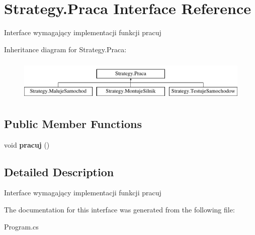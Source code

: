 \hypertarget{interface_strategy_1_1_praca}{}\section{Strategy.\+Praca Interface Reference}
\label{interface_strategy_1_1_praca}


Interface wymagający implementacji funkcji pracuj  


Inheritance diagram for Strategy.\+Praca\+:\begin{figure}[H]
\begin{center}
\leavevmode
\includegraphics[height=2.000000cm]{interface_strategy_1_1_praca}
\end{center}
\end{figure}
\subsection*{Public Member Functions}
\begin{DoxyCompactItemize}
\item 
\mbox{\label{interface_strategy_1_1_praca_a27486a9fd0bbde1361a48bff1855f2b3}} 
void {\bfseries pracuj} ()
\end{DoxyCompactItemize}


\subsection{Detailed Description}
Interface wymagający implementacji funkcji pracuj 



The documentation for this interface was generated from the following file\+:\begin{DoxyCompactItemize}
\item 
Program.\+cs\end{DoxyCompactItemize}
